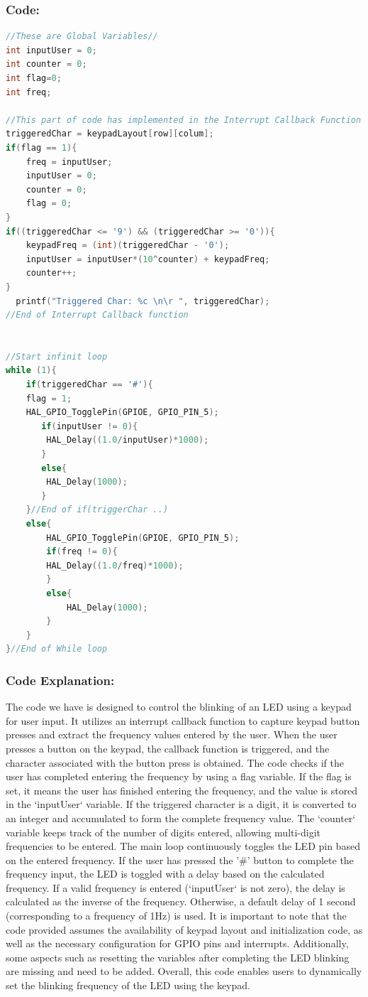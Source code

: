 \documentclass[english]{article}
\begin{document}
\subsubsection{Code:}
\begin{lstlisting}[language=C, caption={C code using listings}, label={lst:label} ]
//These are Global Variables//
int inputUser = 0;
int counter = 0;
int flag=0;
int freq;

//This part of code has implemented in the Interrupt Callback Function
triggeredChar = keypadLayout[row][colum];
if(flag == 1){
    freq = inputUser;
    inputUser = 0;
    counter = 0;
    flag = 0;
}
if((triggeredChar <= '9') && (triggeredChar >= '0')){
    keypadFreq = (int)(triggeredChar - '0');
    inputUser = inputUser*(10^counter) + keypadFreq;
    counter++;
}
  printf("Triggered Char: %c \n\r ", triggeredChar);
//End of Interrupt Callback function


//Start infinit loop
while (1){
    if(triggeredChar == '#'){
	flag = 1;
	HAL_GPIO_TogglePin(GPIOE, GPIO_PIN_5);
	   if(inputUser != 0){
		HAL_Delay((1.0/inputUser)*1000);
	   }
	   else{
		HAL_Delay(1000);
	   }
    }//End of if(triggerChar ..)
    else{
        HAL_GPIO_TogglePin(GPIOE, GPIO_PIN_5);
        if(freq != 0){
        HAL_Delay((1.0/freq)*1000);
        }
        else{
            HAL_Delay(1000);
        }
    }
}//End of While loop
\end{lstlisting}
\subsubsection{Code Explanation:}
The code we have is designed to control the blinking of an LED using 
a keypad for user input. It utilizes an interrupt callback function to 
capture keypad button presses and extract the frequency values entered by the user.
When the user presses a button on the keypad, the callback function is 
triggered, and the character associated with the button press is obtained.
 The code checks if the user has completed entering the frequency by using a 
 flag variable. If the flag is set, it means the user has finished entering 
 the frequency, and the value is stored in the `inputUser` variable.
If the triggered character is a digit, it is converted to an integer and 
accumulated to form the complete frequency value. The `counter` variable keeps
 track of the number of digits entered, allowing multi-digit frequencies to be entered.
The main loop continuously toggles the LED pin based on the entered frequency.
 If the user has pressed the '\#' button to complete the frequency input, 
 the LED is toggled with a delay based on the calculated frequency. 
 If a valid frequency is entered (`inputUser` is not zero), the delay is
  calculated as the inverse of the frequency. Otherwise, a default delay of 
  1 second (corresponding to a frequency of 1Hz) is used.
It is important to note that the code provided assumes the availability of 
keypad layout and initialization code, as well as the necessary configuration 
for GPIO pins and interrupts. Additionally, some aspects such as resetting 
the variables after completing the LED blinking are missing and need to be added.
Overall, this code enables users to dynamically set the blinking frequency of
 the LED using the keypad.
\newpage
\end{document}
